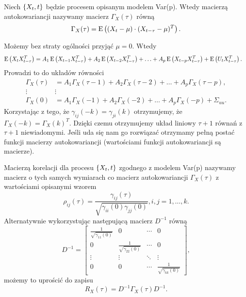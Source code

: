 \documentclass[10pt,a4paper]{book}
\begin{document}
\begin{definition}
Niech $\left\lbrace {{X_t}, {t}} \right\rbrace$ będzie procesem opisanym modelem Var(p). Wtedy macierzą autokowariancji nazywamy macierz $\Gamma_X(\tau)$ równą
$$
\Gamma_X(\tau) = \operatorname{E} \left({ (X_t - \mu) \cdot (X_{t-\tau} - \mu)^T} \right).
$$ 
\end{definition}

Możemy bez straty ogólności przyjąć $\mu = 0$. Wtedy
\begin{align*}
\operatorname{E} \left({X_t X_{t-\tau}^T} \right) & = A_1 \operatorname{E} \left({X_{t-1} X_{t-\tau}^T} \right) + A_2 \operatorname{E} \left({X_{t-2} X_{t-\tau}^T} \right) + \ldots + A_p \operatorname{E} \left({X_{t-p} X_{t-\tau}^T} \right) + \operatorname{E} \left({U_t X_{t-\tau}^T} \right).
\end{align*}
Prowadzi to do układów równości
\begin{align*}
\Gamma_X(\tau) &= A_1 \Gamma_X(\tau-1) + A_2 \Gamma_X(\tau - 2) + \ldots + A_p \Gamma_X(\tau - p), \\
\vdots & \vdots \\
\Gamma_X(0) &= A_1 \Gamma_X(-1) + A_2 \Gamma_X(- 2) + \ldots + A_p \Gamma_X(- p) + \Sigma_{uu}.
\end{align*}
Korzystając z tego, że $ \gamma_{ij}(-k) = \gamma_{ji}(k)$ otrzymujemy, że $\Gamma_X(-k) = \Gamma_X(k)^T$. Dzięki czemu otrzymujemy układ liniowy $\tau+1$ równań z $\tau+1$ niewiadomymi. Jeśli uda się nam go rozwiązać otrzymamy pełną postać funkcji macierzy autokowariancji (wartościami funkcji autokowariancji są macierze). 

\begin{definition}
Macierzą korelacji dla procesu $\left\lbrace {{X_t}, {t}} \right\rbrace$ zgodnego z modelem Var(p) nazywamy macierz o tych samych wymiarach co macierz autokowariancji $\Gamma_X(\tau)$ z wartościami opisanymi wzorem
$$
\rho_{ij}(\tau) = \frac{\gamma_{ij}(\tau)}{ \sqrt{\gamma_{ii}(0) \gamma_{jj}(0) } }, i,j = 1, \ldots, k.
$$
Alternatywnie wykorzystując następującą macierz $D^{-1}$ równą
$$
D^{-1} = \begin{bmatrix}
\frac{1}{\sqrt{\gamma_{11}(0)}} & 0 & \cdots & 0 \\
0 & \frac{1}{\sqrt{\gamma_{22}(0)}} & \cdots & 0 \\
\vdots & \vdots & \ddots & \vdots \\
0 & 0 & \cdots & \frac{1}{\sqrt{\gamma_{kk}(0)}}
\end{bmatrix},
$$
możemy to uprościć do zapisu
$$
R_X(\tau) = D^{-1} \Gamma_X(\tau) D^{-1}. 
$$
\end{definition}
\end{document}
